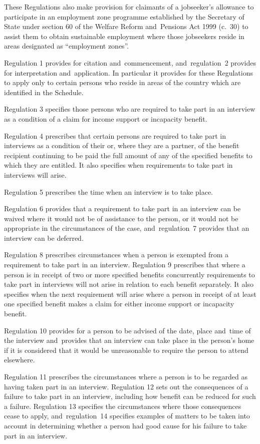\documentclass[12pt,a4paper]{article}
\begin{document}
These Regulations also make provision for claimants of a jobseeker’s allowance to participate in an employment zone programme established by the Secretary of State under section 60 of the Welfare Reform and~Pensions Act 1999 (c.~30) to assist them to obtain sustainable employment where those jobseekers reside in areas designated as “employment zones”.

Regulation 1 provides for citation and~commencement, and~regulation~2 provides for interpretation and~application. In particular it provides for these Regulations to apply only to certain persons who reside in areas of the country which are identified in the Schedule.

Regulation 3 specifies those persons who are required to take part in an interview as a condition of a claim for income support or incapacity benefit.

Regulation 4 prescribes that certain persons are required to take part in interviews as a condition of their or, where they are a partner, of the benefit recipient continuing to be paid the full amount of any of the specified benefits to which they are entitled. It also specifies when requirements to take part in interviews will arise.

Regulation 5 prescribes the time when an interview is to take place.

Regulation 6 provides that a requirement to take part in an interview can be waived where it would not be of assistance to the person, or it would not be appropriate in the circumstances of the case, and~regulation~7 provides that an interview can be deferred.

Regulation 8 prescribes circumstances when a person is exempted from a requirement to take part in an interview. Regulation 9 prescribes that where a person is in receipt of two or more specified benefits concurrently requirements to take part in interviews will not arise in relation to each benefit separately. It also specifies when the next requirement will arise where a person in receipt of at least one specified benefit makes a claim for either income support or incapacity benefit.

Regulation 10 provides for a person to be advised of the date, place and~time of the interview and~provides that an interview can take place in the person’s home if it is considered that it would be unreasonable to require the person to attend elsewhere.

Regulation 11 prescribes the circumstances where a person is to be regarded as having taken part in an interview. Regulation 12 sets out the consequences of a failure to take part in an interview, including how benefit can be reduced for such a failure. Regulation 13 specifies the circumstances where those consequences cease to apply, and~regulation~14 specifies examples of matters to be taken into account in determining whether a person had good cause for his failure to take part in an interview.
\end{document}
